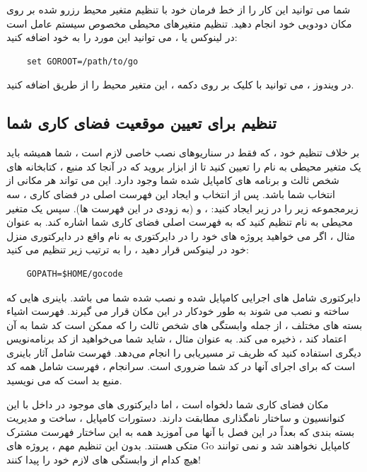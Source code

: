 \documentclass[12pt]{book}
\begin{document}
شما می توانید این کار را از خط فرمان خود با تنظیم متغیر محیط  رزرو شده بر روی مکان دودویی خود انجام دهید. تنظیم متغیرهای محیطی مخصوص سیستم عامل است
در لینوکس یا  ، می توانید این مورد را به  خود اضافه کنید:
\begin{latin}
	\begin{lstlisting}
	set GOROOT=/path/to/go
	\end{lstlisting}
\end{latin}
در ویندوز ، می توانید با کلیک بر روی دکمه  ، این متغیر محیط را از طریق  اضافه کنید.
\subsection{تنظیم  برای تعیین موقعیت فضای کاری شما}
بر خلاف تنظیم  خود ، که فقط در سناریوهای نصب خاصی لازم است ، شما همیشه باید یک متغیر محیطی به نام  را تعیین کنید تا از ابزار  بروید که در آنجا کد منبع ، کتابخانه های شخص ثالث و برنامه های کامپایل شده شما وجود دارد.
این می تواند هر مکانی از انتخاب شما باشد.
پس از انتخاب و ایجاد این فهرست اصلی در فضای کاری ، سه زیرمجموعه زیر را در زیر ایجاد کنید: ،  و  (به زودی در این فهرست ها).
سپس یک متغیر محیطی به نام  تنظیم کنید که به فهرست اصلی فضای کاری شما اشاره کند.
به عنوان مثال ، اگر می خواهید پروژه های خود را در دایرکتوری به نام  واقع در دایرکتوری منزل خود در لینوکس قرار دهید ،  را به ترتیب زیر تنظیم می کنید:
\begin{latin}
	\begin{lstlisting}
	GOPATH=$HOME/gocode
	\end{lstlisting}
\end{latin}
دایرکتوری  شامل  های اجرایی کامپایل شده و نصب شده شما می باشد.
باینری هایی که ساخته و نصب می شوند به طور خودکار در این مکان قرار می گیرند.
فهرست  اشیاء بسته های مختلف ، از جمله وابستگی های شخص ثالث  را که ممکن است کد شما به آن اعتماد کند ، ذخیره می کند.
به عنوان مثال ، شاید شما می‌خواهید از کد برنامه‌نویس دیگری استفاده کنید که ظریف تر مسیریابی  را انجام می‌دهد.
فهرست  شامل آثار باینری است که برای اجرای آنها در کد شما ضروری است.
سرانجام ، فهرست  شامل همه کد منبع بد است که می نویسید.

مکان فضای کاری شما دلخواه است ، اما دایرکتوری های موجود در داخل با این کنوانسیون و ساختار نامگذاری مطابقت دارند.
دستورات کامپایل ، ساخت و مدیریت بسته بندی که بعداً در این فصل با آنها می آموزید همه به این ساختار فهرست مشترک متکی هستند.
بدون این تنظیم مهم ، پروژه های Go کامپایل نخواهند شد و نمی توانند هیچ کدام از وابستگی های لازم خود را پیدا کنند!
\end{document}
